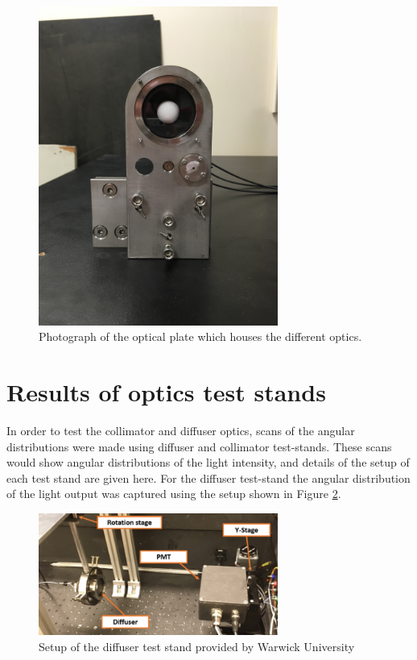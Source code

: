 \begin{figure}
    \centering
    \includegraphics[width=0.7\textwidth]{Figures/optical_plate.jpg}
    \caption{Photograph of the optical plate which houses the different optics.}
    \label{fig:optical_plate}
\end{figure}


\section{Results of optics test stands}

In order to test the collimator and diffuser optics, scans of the angular distributions were made using diffuser and collimator test-stands. These scans would show angular distributions of the light intensity, and details of the setup of each test stand are given here. For the diffuser test-stand the angular distribution of the light output was captured using the setup shown in Figure \ref{fig:diffuser_test_stand}. 

\begin{figure}
    \centering
    \includegraphics[width=0.7\textwidth]{Figures/diffuser_test_stand.png}
    \caption{Setup of the diffuser test stand provided by Warwick University}
    \label{fig:diffuser_test_stand}
\end{figure}


